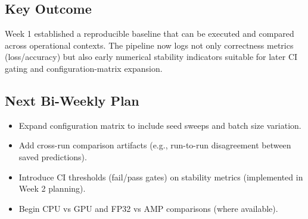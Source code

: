 \documentclass[11pt]{article}
\begin{document}
\subsection*{Key Outcome}
Week 1 established a reproducible baseline that can be executed and compared across operational contexts. The pipeline now logs not only correctness metrics (loss/accuracy) but also early numerical stability indicators suitable for later CI gating and configuration-matrix expansion.

\subsection*{Next Bi-Weekly Plan}
\begin{itemize}
  \item Expand configuration matrix to include seed sweeps and batch size variation.
  \item Add cross-run comparison artifacts (e.g., run-to-run disagreement between saved predictions).
  \item Introduce CI thresholds (fail/pass gates) on stability metrics (implemented in Week 2 planning).
  \item Begin CPU vs GPU and FP32 vs AMP comparisons (where available).
\end{itemize}
\end{document}
